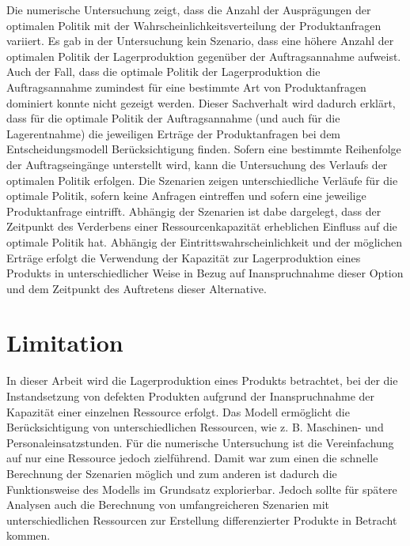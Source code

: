 Die numerische Untersuchung zeigt, dass die Anzahl der Ausprägungen der optimalen Politik mit der Wahrscheinlichkeitsverteilung der Produktanfragen variiert. Es gab in der Untersuchung kein Szenario, dass eine höhere Anzahl der optimalen Politik der Lagerproduktion gegenüber der Auftragsannahme aufweist. Auch der Fall, dass die optimale Politik der Lagerproduktion die Auftragsannahme zumindest für eine bestimmte Art von Produktanfragen dominiert konnte nicht gezeigt werden. Dieser Sachverhalt wird dadurch erklärt, dass für die optimale Politik der Auftragsannahme (und auch für die Lagerentnahme) die jeweiligen Erträge der Produktanfragen bei dem Entscheidungsmodell Berücksichtigung finden. Sofern eine bestimmte Reihenfolge der Auftragseingänge unterstellt wird, kann die Untersuchung des Verlaufs der optimalen Politik erfolgen. Die Szenarien zeigen unterschiedliche Verläufe für die optimale Politik, sofern keine Anfragen eintreffen und sofern eine jeweilige Produktanfrage eintrifft. Abhängig der Szenarien ist dabe dargelegt, dass der Zeitpunkt des Verderbens einer Ressourcenkapazität erheblichen Einfluss auf die optimale Politik hat. Abhängig der Eintrittswahrscheinlichkeit und der möglichen Erträge erfolgt die Verwendung der Kapazität zur Lagerproduktion eines Produkts in unterschiedlicher Weise in Bezug auf Inanspruchnahme dieser Option und dem Zeitpunkt des Auftretens dieser Alternative.

\section*{Limitation}

In dieser Arbeit wird die Lagerproduktion eines Produkts betrachtet, bei der die Instandsetzung von defekten Produkten aufgrund der Inanspruchnahme der Kapazität einer einzelnen Ressource erfolgt. Das Modell ermöglicht die Berücksichtigung von unterschiedlichen Ressourcen, wie z. B. Maschinen- und Personaleinsatzstunden. Für die numerische Untersuchung ist die Vereinfachung auf nur eine Ressource jedoch zielführend. Damit war zum einen die schnelle Berechnung der Szenarien möglich und zum anderen ist dadurch die Funktionsweise des Modells im Grundsatz explorierbar. Jedoch sollte für spätere Analysen auch die Berechnung von umfangreicheren Szenarien mit unterschiedlichen Ressourcen zur Erstellung differenzierter Produkte in Betracht kommen.

